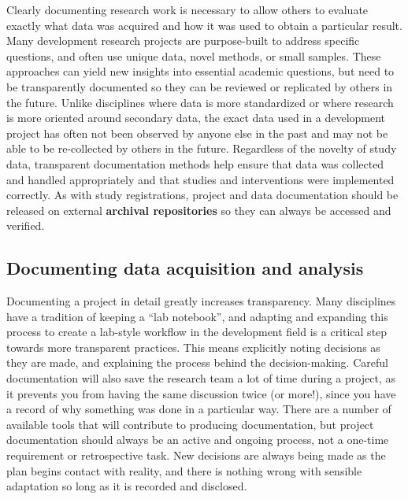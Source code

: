 Clearly documenting research work is necessary
to allow others to evaluate exactly what data was acquired and how it was used
to obtain a particular result.
Many development research projects are purpose-built
to address specific questions,
and often use unique data, novel methods, or small samples.
These approaches can yield new insights into essential academic questions,
but need to be transparently documented so they can be reviewed
or replicated by others in the future.\cite{duvendack2017meant}
Unlike disciplines where data is more standardized
or where research is more oriented around secondary data,
 the exact data used in a development project
has often not been observed by anyone else in the past
and may not be able to be re-collected by others in the future.
Regardless of the novelty of study data,
transparent documentation methods help ensure
that data was collected and handled appropriately
and that studies and interventions were implemented correctly.
As with study registrations, project and data documentation
should be released on external \textbf{archival repositories}
so they can always be accessed and verified.

\subsection{Documenting data acquisition and analysis}

Documenting a project in detail greatly increases transparency.
Many disciplines have a tradition of keeping a ``lab notebook'',
and adapting and expanding this process to create a
lab-style workflow in the development field is a
critical step towards more transparent practices.
This means explicitly noting decisions as they are made,
and explaining the process behind the decision-making.
Careful documentation will also save the research team a lot of time during a project,
as it prevents you from having the same discussion twice (or more!),
since you have a record of why something was done in a particular way.
There are a number of available tools
that will contribute to producing documentation,
but project documentation should always be an active and ongoing process,
not a one-time requirement or retrospective task.
New decisions are always being made as the plan begins contact with reality,
and there is nothing wrong with sensible adaptation so long as it is recorded and disclosed.

